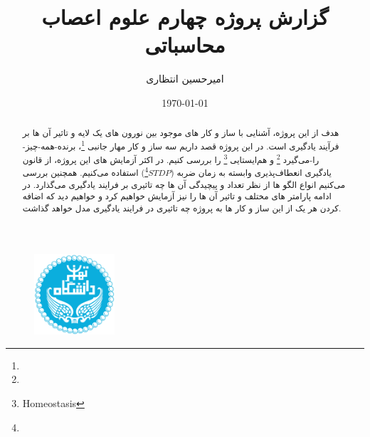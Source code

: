 \documentclass{report}
\title{گزارش پروژه چهارم علوم اعصاب محاسباتی}
\author{امیرحسین انتظاری}
\date{\today}
\begin{document}
\begin{figure}
    \centering \includegraphics[height=3cm]{images/Logo.png}
\end{figure}
\renewcommand{\chaptername}{بخش}
\newpage
\maketitle
\newpage
\tableofcontents

    \begin{abstract}
        هدف از این پروژه، آشنایی با ساز و کار های موجود بین نورون های یک لایه و تاثیر آن ها بر فرآیند یادگیری است. در این پروژه قصد داریم سه ساز و کار مهار جانبی
        \footnote{}، 
        برنده-همه-چیز-را-می‌گیرد
        \footnote{} و
        هم‌ایستایی
        \footnote{Homeostasis} 
        را بررسی کنیم. در اکثر آزمایش های این پروژه، از قانون یادگیری انعطاف‌پذیری وابسته به زمان ضربه 
        ($STDP$\footnote{}) 
        استفاده می‌کنیم. همچنین بررسی می‌کنیم انواع الگو ها از نظر تعداد و پیچیدگی آن ها چه تاثیری بر فرایند یادگیری می‌گذارد. در ادامه پارامتر های مختلف و تاثیر آن ها را نیز آزمایش خواهیم کرد و خواهیم دید که اضافه کردن هر یک از این ساز و کار ها به پروژه چه تاثیری در فرایند یادگیری مدل خواهد گذاشت.
    \end{abstract}
\restoregeometry


\newpage

\newpage



\end{document}
